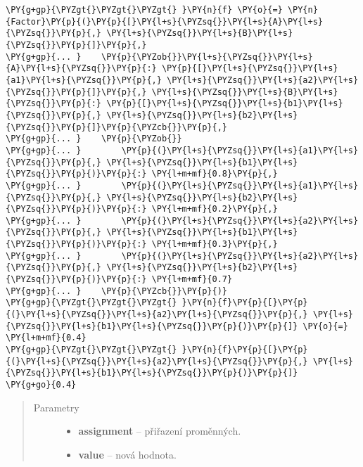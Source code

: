\begin{fulllineitems}
\begin{fulllineitems}
\begin{Verbatim}[commandchars=\\\{\}]
\PY{g+gp}{\PYZgt{}\PYZgt{}\PYZgt{} }\PY{n}{f} \PY{o}{=} \PY{n}{Factor}\PY{p}{(}\PY{p}{[}\PY{l+s}{\PYZsq{}}\PY{l+s}{A}\PY{l+s}{\PYZsq{}}\PY{p}{,} \PY{l+s}{\PYZsq{}}\PY{l+s}{B}\PY{l+s}{\PYZsq{}}\PY{p}{]}\PY{p}{,}
\PY{g+gp}{... }    \PY{p}{\PYZob{}}\PY{l+s}{\PYZsq{}}\PY{l+s}{A}\PY{l+s}{\PYZsq{}}\PY{p}{:} \PY{p}{[}\PY{l+s}{\PYZsq{}}\PY{l+s}{a1}\PY{l+s}{\PYZsq{}}\PY{p}{,} \PY{l+s}{\PYZsq{}}\PY{l+s}{a2}\PY{l+s}{\PYZsq{}}\PY{p}{]}\PY{p}{,} \PY{l+s}{\PYZsq{}}\PY{l+s}{B}\PY{l+s}{\PYZsq{}}\PY{p}{:} \PY{p}{[}\PY{l+s}{\PYZsq{}}\PY{l+s}{b1}\PY{l+s}{\PYZsq{}}\PY{p}{,} \PY{l+s}{\PYZsq{}}\PY{l+s}{b2}\PY{l+s}{\PYZsq{}}\PY{p}{]}\PY{p}{\PYZcb{}}\PY{p}{,}
\PY{g+gp}{... }    \PY{p}{\PYZob{}}
\PY{g+gp}{... }        \PY{p}{(}\PY{l+s}{\PYZsq{}}\PY{l+s}{a1}\PY{l+s}{\PYZsq{}}\PY{p}{,} \PY{l+s}{\PYZsq{}}\PY{l+s}{b1}\PY{l+s}{\PYZsq{}}\PY{p}{)}\PY{p}{:} \PY{l+m+mf}{0.8}\PY{p}{,}
\PY{g+gp}{... }        \PY{p}{(}\PY{l+s}{\PYZsq{}}\PY{l+s}{a1}\PY{l+s}{\PYZsq{}}\PY{p}{,} \PY{l+s}{\PYZsq{}}\PY{l+s}{b2}\PY{l+s}{\PYZsq{}}\PY{p}{)}\PY{p}{:} \PY{l+m+mf}{0.2}\PY{p}{,}
\PY{g+gp}{... }        \PY{p}{(}\PY{l+s}{\PYZsq{}}\PY{l+s}{a2}\PY{l+s}{\PYZsq{}}\PY{p}{,} \PY{l+s}{\PYZsq{}}\PY{l+s}{b1}\PY{l+s}{\PYZsq{}}\PY{p}{)}\PY{p}{:} \PY{l+m+mf}{0.3}\PY{p}{,}
\PY{g+gp}{... }        \PY{p}{(}\PY{l+s}{\PYZsq{}}\PY{l+s}{a2}\PY{l+s}{\PYZsq{}}\PY{p}{,} \PY{l+s}{\PYZsq{}}\PY{l+s}{b2}\PY{l+s}{\PYZsq{}}\PY{p}{)}\PY{p}{:} \PY{l+m+mf}{0.7}
\PY{g+gp}{... }    \PY{p}{\PYZcb{}}\PY{p}{)}
\PY{g+gp}{\PYZgt{}\PYZgt{}\PYZgt{} }\PY{n}{f}\PY{p}{[}\PY{p}{(}\PY{l+s}{\PYZsq{}}\PY{l+s}{a2}\PY{l+s}{\PYZsq{}}\PY{p}{,} \PY{l+s}{\PYZsq{}}\PY{l+s}{b1}\PY{l+s}{\PYZsq{}}\PY{p}{)}\PY{p}{]} \PY{o}{=} \PY{l+m+mf}{0.4}
\PY{g+gp}{\PYZgt{}\PYZgt{}\PYZgt{} }\PY{n}{f}\PY{p}{[}\PY{p}{(}\PY{l+s}{\PYZsq{}}\PY{l+s}{a2}\PY{l+s}{\PYZsq{}}\PY{p}{,} \PY{l+s}{\PYZsq{}}\PY{l+s}{b1}\PY{l+s}{\PYZsq{}}\PY{p}{)}\PY{p}{]}
\PY{g+go}{0.4}
\end{Verbatim}
\begin{quote}\begin{description}
\item[{Parametry}] \leavevmode\begin{itemize}
\item {} 
\textbf{assignment} -- přiřazení proměnných.

\item {} 
\textbf{value} -- nová hodnota.

\end{itemize}


\end{description}
\end{quote}
\end{fulllineitems}
\end{fulllineitems}
